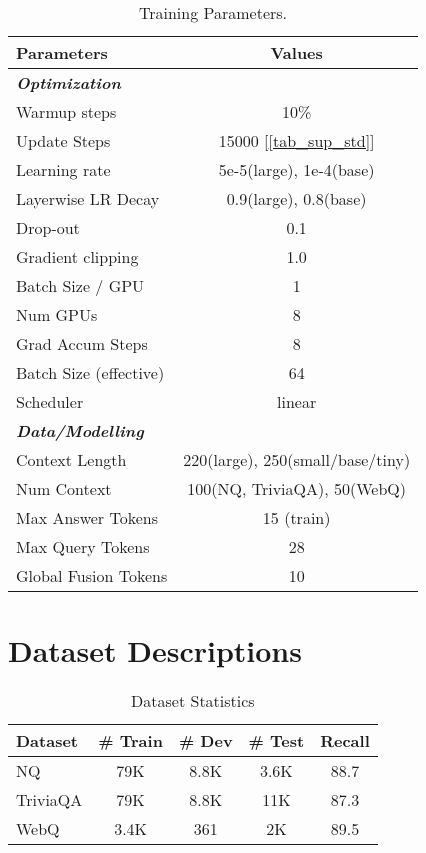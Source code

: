 \documentclass[11pt]{article}
\begin{document}
\begin{table}[h]
\begin{center}
\begin{small}
\begin{tabular}{lc}
\hline
\toprule
\textbf{Parameters} & \textbf{Values} \\
\toprule
\textit{\textbf{Optimization} }\\
Warmup steps & 10\% \\
Update Steps & 15000 [\cref{tab_sup_std}] \\
Learning rate & 5e-5(large), 1e-4(base) \\
Layerwise LR Decay & 0.9(large), 0.8(base) \\
Drop-out & 0.1 \\
Gradient clipping & 1.0 \\
Batch Size / GPU & 1 \\
Num GPUs & 8 \\
Grad Accum Steps & 8 \\
Batch Size (effective) & 64 \\
Scheduler & linear \\
\midrule
\textit{\textbf{Data/Modelling} }\\
Context Length & 220(large), 250(small/base/tiny) \\
Num Context & 100(NQ, TriviaQA), 50(WebQ)\\
Max Answer Tokens & 15 (train) \\
Max Query Tokens & 28 \\
Global Fusion Tokens & 10 \\

\bottomrule
\end{tabular}
\end{small}
\end{center}
\caption{\label{tab-hyperparam} Training Parameters.}
\end{table}

\section{Dataset Descriptions}

\begin{table}[h!]
\begin{center}
\begin{tabular}{lcccc}
\toprule
\textbf{Dataset} & \textbf{\# Train} & \textbf{\# Dev} & \textbf{\# Test} & \textbf{Recall} \\ 
\toprule
NQ & 79K & 8.8K & 3.6K & 88.7 \\
TriviaQA & 79K & 8.8K & 11K & 87.3 \\
WebQ & 3.4K & 361 & 2K & 89.5 \\
\bottomrule
\end{tabular}

\end{center}
\caption{Dataset Statistics}
\label{tab_dataset}
\end{table}
\end{document}
